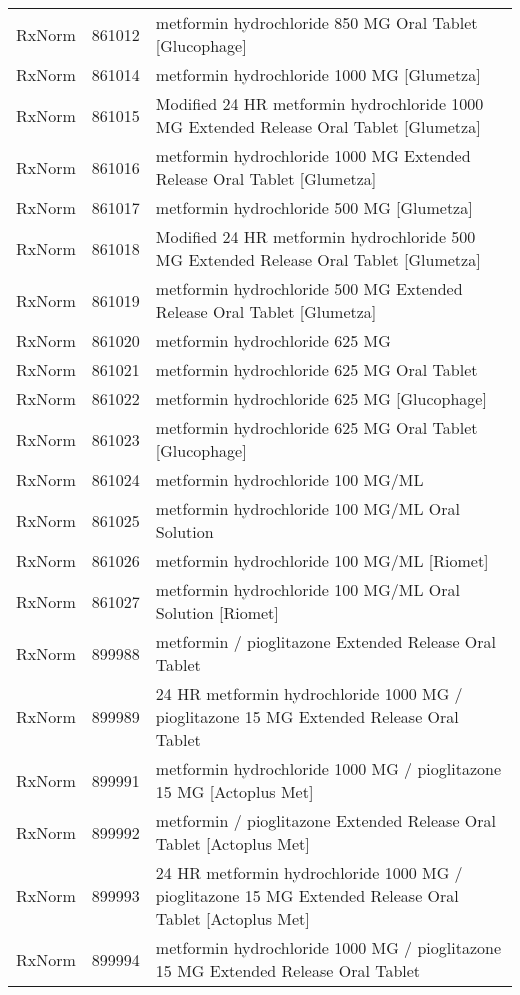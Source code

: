 \begin{longtable}{p{}p{}p{}}
  RxNorm & 861012 & metformin hydrochloride 850 MG Oral Tablet [Glucophage] \\ 
  RxNorm & 861014 & metformin hydrochloride 1000 MG [Glumetza] \\ 
  RxNorm & 861015 & Modified 24 HR metformin hydrochloride 1000 MG Extended Release Oral Tablet [Glumetza] \\ 
  RxNorm & 861016 & metformin hydrochloride 1000 MG Extended Release Oral Tablet [Glumetza] \\ 
  RxNorm & 861017 & metformin hydrochloride 500 MG [Glumetza] \\ 
  RxNorm & 861018 & Modified 24 HR metformin hydrochloride 500 MG Extended Release Oral Tablet [Glumetza] \\ 
  RxNorm & 861019 & metformin hydrochloride 500 MG Extended Release Oral Tablet [Glumetza] \\ 
  RxNorm & 861020 & metformin hydrochloride 625 MG \\ 
  RxNorm & 861021 & metformin hydrochloride 625 MG Oral Tablet \\ 
  RxNorm & 861022 & metformin hydrochloride 625 MG [Glucophage] \\ 
  RxNorm & 861023 & metformin hydrochloride 625 MG Oral Tablet [Glucophage] \\ 
  RxNorm & 861024 & metformin hydrochloride 100 MG/ML \\ 
  RxNorm & 861025 & metformin hydrochloride 100 MG/ML Oral Solution \\ 
  RxNorm & 861026 & metformin hydrochloride 100 MG/ML [Riomet] \\ 
  RxNorm & 861027 & metformin hydrochloride 100 MG/ML Oral Solution [Riomet] \\ 
  RxNorm & 899988 & metformin / pioglitazone Extended Release Oral Tablet \\ 
  RxNorm & 899989 & 24 HR metformin hydrochloride 1000 MG / pioglitazone 15 MG Extended Release Oral Tablet \\ 
  RxNorm & 899991 & metformin hydrochloride 1000 MG / pioglitazone 15 MG [Actoplus Met] \\ 
  RxNorm & 899992 & metformin / pioglitazone Extended Release Oral Tablet [Actoplus Met] \\ 
  RxNorm & 899993 & 24 HR metformin hydrochloride 1000 MG / pioglitazone 15 MG Extended Release Oral Tablet [Actoplus Met] \\ 
  RxNorm & 899994 & metformin hydrochloride 1000 MG / pioglitazone 15 MG Extended Release Oral Tablet \\ 

\end{longtable}
